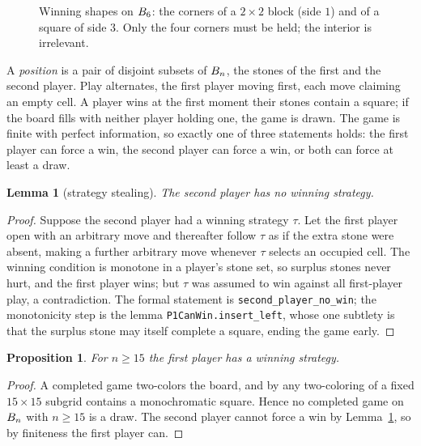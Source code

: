 \documentclass[11pt]{amsart}
\newtheorem{lemma}[theorem]{Lemma}
\newtheorem{proposition}[theorem]{Proposition}
\theoremstyle{definition}
\theoremstyle{remark}
\begin{document}
\begin{figure}[ht]
\centering
{}
\caption{Winning shapes on $B_6$: the corners of a $2 \times 2$
block (side $1$) and of a square of side $3$. Only the four corners
must be held; the interior is irrelevant.}
\label{fig:rules}
\end{figure}

A \emph{position} is a pair of disjoint subsets of $B_n$, the
stones of the first and the second player. Play alternates, the first
player moving first, each move claiming an empty cell. A player wins
at the first moment their stones contain a square; if the board fills
with neither player holding one, the game is drawn. The game is finite
with perfect information, so exactly one of three statements holds:
the first player can force a win, the second player can force a win,
or both can force at least a draw.

\begin{lemma}[strategy stealing]\label{lem:stealing}
The second player has no winning strategy.
\end{lemma}

\begin{proof}
Suppose the second player had a winning strategy $\tau$. Let the first
player open with an arbitrary move and thereafter follow $\tau$ as if
the extra stone were absent, making a further arbitrary move whenever
$\tau$ selects an occupied cell. The winning condition is monotone in
a player's stone set, so surplus stones never hurt, and the first
player wins; but $\tau$ was assumed to win against all first-player
play, a contradiction. The formal statement is
\texttt{second\_player\_no\_win}; the monotonicity step is the lemma
\texttt{P1CanWin.insert\_left}, whose one subtlety is that the
surplus stone may itself complete a square, ending the game early.
\end{proof}

\begin{proposition}\label{prop:large}
For $n \ge 15$ the first player has a winning strategy.
\end{proposition}

\begin{proof}
A completed game two-colors the board, and by \cite{bacher-eliahou}
any two-coloring of a fixed $15 \times 15$ subgrid contains a
monochromatic square. Hence no completed game on $B_n$ with
$n \ge 15$ is a draw. The second player cannot force a win by
Lemma~\ref{lem:stealing}, so by finiteness the first player can.
\end{proof}
\end{document}
